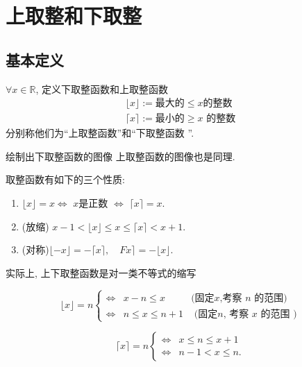 \documentclass{ctexart}
\begin{document}
\section{上取整和下取整} 

\subsection{基本定义} 

\begin{definition}[上取整和下取整]
    $\forall x \in \mathbb{R}$, 定义下取整函数和上取整函数
    \begin{align*}
    \lfloor x\rfloor:= \text{最大的} \leqslant x \text{的整数}\\
    \lceil x\rceil := \text{最小的} \geqslant x\text{ 的整数}
    \end{align*}
    分别称他们为``上取整函数''和``下取整函数 ''.
    
\end{definition}

\begin{example}绘制出下取整函数的图像
   上取整函数的图像也是同理.  
\end{example}

\begin{prop}
    取整函数有如下的三个性质: 

    \begin{enumerate}
        \item $\lfloor x\rfloor=x \iff$ $x$是正数 $\iff $ $\lceil x\rceil=x$.
        \item (放缩) $x-1<\lfloor x\rfloor \leqslant x \leqslant\lceil x\rceil<x+1$.
        \item (对称)$\lfloor-x\rfloor=-\lceil x\rceil, \quad F x\rceil=-\lfloor x\rfloor$.
    \end{enumerate}
    
\end{prop}

\begin{prop}
    实际上, 上下取整函数是对一类不等式的缩写

    $$
\lfloor x\rfloor=n\left\{\begin{array}{lll}
    \iff & x-n \leqslant x & \text {(固定}x\text{,考察 } n \text { 的范围) } \\
\iff & n \leqslant x \leqslant n+1 & \text { (固定}n\text{, 考察 } x \text { 的范围 })
\end{array}\right.
$$

$$
\lceil x\rceil=n \begin{cases}\iff & x \leqslant n \leqslant x+1 \\ \iff & n-1<x \leqslant n .\end{cases}
$$

    
\end{prop}
\end{document}
